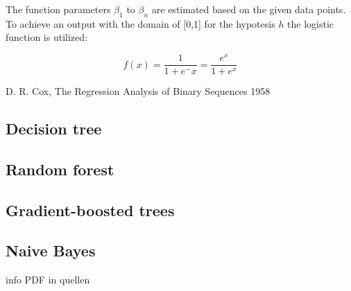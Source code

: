  The function parameters $\beta_1$ to  $\beta_n$ are estimated based on the given data points.  
To achieve an output with the domain of [0,1] for the hypotesis $h$ the logistic function is utilized:

\begin{equation} \label{eq:6}
f(x)=\frac{1}{1+e^-x}=\frac{e^x}{1+e^x}
\end{equation}



D. R. Cox, The Regression Analysis of Binary Sequences 1958
\subsection{Decision tree}
\subsection{Random forest}
\subsection{Gradient-boosted trees}
\subsection{Naive Bayes}
info PDF in quellen